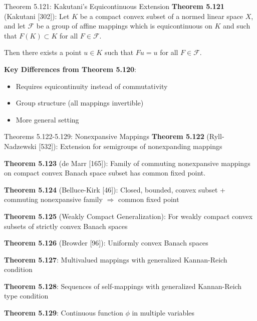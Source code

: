 \documentclass[aspectratio=169,10pt]{beamer}
\begin{document}
\begin{frame}{Theorem 5.121: Kakutani's Equicontinuous Extension}
    \textbf{Theorem 5.121} (Kakutani [302]): Let $K$ be a compact convex subset of a normed linear space $X$, and let $\mathcal{F}$ be a group of affine mappings which is equicontinuous on $K$ and such that $F(K) \subset K$ for all $F \in \mathcal{F}$.

    \medskip

    Then there exists a point $u \in K$ such that $Fu = u$ for all $F \in \mathcal{F}$.

    \medskip

    \textbf{Key Differences from Theorem 5.120}:
    \begin{itemize}
        \item Requires equicontinuity instead of commutativity
        \item Group structure (all mappings invertible)
        \item More general setting
    \end{itemize}
\end{frame}

\begin{frame}{Theorems 5.122-5.129: Nonexpansive Mappings}
    \textbf{Theorem 5.122} (Ryll-Nadzewski [532]): Extension for semigroups of nonexpanding mappings

    \textbf{Theorem 5.123} (de Marr [165]): Family of commuting nonexpansive mappings on compact convex Banach space subset has common fixed point.

    \textbf{Theorem 5.124} (Belluce-Kirk [46]): Closed, bounded, convex subset + commuting nonexpansive family $\Rightarrow$ common fixed point

    \textbf{Theorem 5.125} (Weakly Compact Generalization): For weakly compact convex subsets of strictly convex Banach spaces

    \textbf{Theorem 5.126} (Browder [96]): Uniformly convex Banach spaces

    \textbf{Theorem 5.127}: Multivalued mappings with generalized Kannan-Reich condition

    \textbf{Theorem 5.128}: Sequences of self-mappings with generalized Kannan-Reich type condition

    \textbf{Theorem 5.129}: Continuous function $\phi$ in multiple variables
\end{frame}
\end{document}
